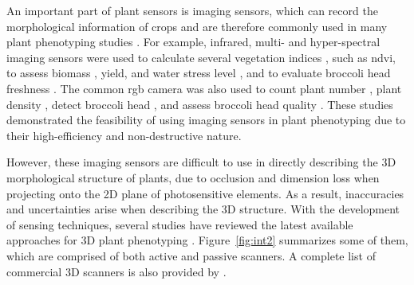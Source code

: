 An important part of plant sensors is imaging sensors, which can record the morphological information of crops and are therefore commonly used in many plant phenotyping studies \citep{paulus_measuring_2019, feng_comprehensive_2021}. For example, infrared, multi- and hyper-spectral imaging sensors were used to calculate several vegetation indices \citep{han_modeling_2019}, such as \gls{ndvi}, to assess biomass \citep{jimenez-berni_high_2018}, yield, and water stress level \citep{herrero_yield_2020, romano_use_2011}, and to evaluate broccoli head freshness \citep{guo_evaluation_2022}. The common \gls{rgb} camera was also used to count plant number \citep{liu_estimating_2022}, plant density \citep{velumani_estimates_2021}, detect broccoli head \citep{blok_machine_2016}, and assess broccoli head quality \citep{stansell_use_2017}. These studies demonstrated the feasibility of using imaging sensors in plant phenotyping due to their high-efficiency and non-destructive nature.

However, these imaging sensors are difficult to use in directly describing the 3D morphological structure of plants, due to occlusion and dimension loss when projecting onto the 2D plane of photosensitive elements. As a result, inaccuracies and uncertainties arise when describing the 3D structure. With the development of sensing techniques, several studies have reviewed the latest available approaches for 3D plant phenotyping \citep{paulus_measuring_2019, okura_3d_2022, kochi_introduction_2021}. Figure~\ref{fig:int2} summarizes some of them, which are comprised of both active and passive scanners. A complete list of commercial 3D scanners is also provided by \citet[Table 5]{bartol_review_2021}.



